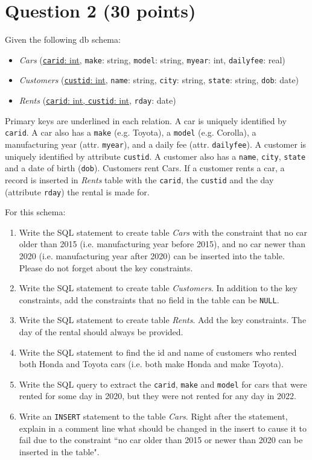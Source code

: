 \documentclass[letterpaper, 11pt]{article}
\begin{document}
\section*{Question 2 (30 points)}

Given the following db schema:
\begin{itemize}
    \item \textit{Cars} (\ul{\texttt{carid}: int}, \texttt{make}: string, \texttt{model}: string, \texttt{myear}: int, \texttt{dailyfee}: real)
    \item \textit{Customers} (\ul{\texttt{custid}: int}, \texttt{name}: string, \texttt{city}: string, \texttt{state}: string, \texttt{dob}: date)
    \item \textit{Rents} (\ul{\texttt{carid}: int, \texttt{custid}: int}, \texttt{rday}: date)
\end{itemize}

Primary keys are underlined in each relation. A car is uniquely identified by \texttt{carid}. A car also has a \texttt{make} (e.g. Toyota), a \texttt{model} (e.g. Corolla), a manufacturing year (attr. \texttt{myear}), and a daily fee (attr. \texttt{dailyfee}). A customer is uniquely identified by attribute \texttt{custid}. A customer also has a \texttt{name}, \texttt{city}, \texttt{state} and a date of birth (\texttt{dob}). Customers rent Cars. If a customer rents a car, a record is inserted in \textit{Rents} table with the \texttt{carid}, the \texttt{custid} and the day (attribute \texttt{rday}) the rental is made for.

For this schema:
\begin{enumerate}[label={\alph*})]
    \item Write the SQL statement to create table \textit{Cars} with the constraint that no car older than 2015 (i.e. manufacturing year before 2015), and no car newer than 2020 (i.e. manufacturing year after 2020) can be inserted into the table. Please do not forget about the key constraints. 
    \item Write the SQL statement to create table \textit{Customers}. In addition to the key constraints, add the constraints that no field in the table can be \texttt{NULL}.
    \item Write the SQL statement to create table \textit{Rents}. Add the key constraints. The day of the rental should always be provided.
    \item Write the SQL statement to find the id and name of customers who rented both Honda and Toyota cars (i.e. both make Honda and make Toyota).
    \item Write the SQL query to extract the \texttt{carid}, \texttt{make} and \texttt{model} for cars that were rented for some day in 2020, but they were not rented for any day in 2022.
    \item Write an \texttt{INSERT} statement to the table \textit{Cars}. Right after the statement, explain in a comment line what should be changed in the insert to cause it to fail due to the constraint ``no car older than 2015 or newer than 2020 can be inserted in the table".
\end{enumerate}
\end{document}
